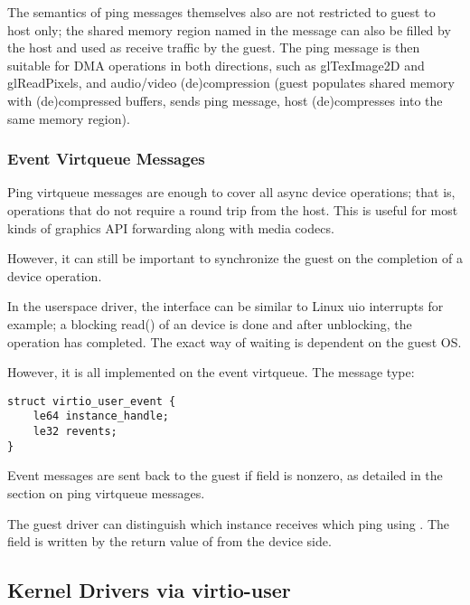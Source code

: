 The semantics of ping messages themselves also are not restricted to guest to host only;
the shared memory region named in the message can also be filled by the host
and used as receive traffic by the guest.
The ping message is then suitable for DMA operations in both directions,
such as glTexImage2D and glReadPixels,
and audio/video (de)compression (guest populates shared memory with (de)compressed buffers,
sends ping message, host (de)compresses into the same memory region).

\subsubsection{Event Virtqueue Messages}\label{sec:Device Types / User Device / Device Operation / Event Virtqueue Messages}

Ping virtqueue messages are enough to cover all async device operations;
that is, operations that do not require a round trip from the host.
This is useful for most kinds of graphics API forwarding along
with media codecs.

However, it can still be important to synchronize the guest on the completion
of a device operation.

In the userspace driver, the interface can be similar to Linux uio interrupts for example;
a blocking read() of an device is done and after unblocking,
the operation has completed.
The exact way of waiting is dependent on the guest OS.

However, it is all implemented on the event virtqueue. The message type:

\begin{lstlisting}
struct virtio_user_event {
    le64 instance_handle;
    le32 revents;
}
\end{lstlisting}

Event messages are sent back to the guest if  field is nonzero,
as detailed in the section on ping virtqueue messages.

The guest driver can distinguish which instance receives which ping using
.
The field  is written by the return value of
 from the device side.

\subsection{Kernel Drivers via virtio-user}\label{sec:Device Types / User Device / Kernel Drivers via virtio-user}

